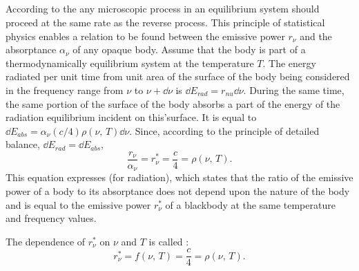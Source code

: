 \subsection{}\label{36.1.6} According to the  any microscopic process in an equilibrium system should proceed at the same rate as the reverse process. This principle of statistical physics enables a relation to be found between the emissive power $r_{\nu}$ and the absorptance $\alpha_{\nu}$ of any opaque body. Assume that the body is part of a thermodynamically equilibrium system at the temperature $T$. The energy radiated per unit time from unit area of the surface of the body being considered in
the frequency range from $\nu$ to $\nu + \dd \nu$ is
$\dd E_{rad} = r_{nu}\dd \nu$. During the same time, the same portion of the surface of the body absorbs a part of the energy of the radiation equilibrium  incident on this'surface. It is equal to $\dd E_{abs} = \alpha_{\nu} (c/4) \rho (\nu,\, T) \dd \nu$. Since, according to the principle of detailed balance, $\dd E_{rad} = \dd E_{abs}$,
\begin{equation*}%
\frac{r_{\nu}}{\alpha_{\nu}} = r_{\nu}^{*} = \frac{c}{4} =\rho (\nu, \, T).
\end{equation*}
This equation expresses  (for radiation), which states that the ratio of the emissive power of a body to its absorptance does not depend upon the nature of the body and is equal to the emissive power $r_{\nu}^{*}$ of a blackbody at the same temperature and frequency values.

The dependence of $r_{\nu}^{*}$ on $\nu$ and $T$ is called :
\begin{equation*}%
r_{\nu}^{*} = f(\nu, \, T) = \frac{c}{4} =\rho (\nu, \, T).
\end{equation*}

